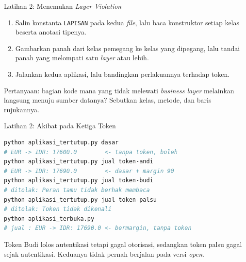 \documentclass[aspectratio=169, table, 12pt]{beamer}
\begin{document}
\begin{frame}[fragile]{{\Large Latihan 2: Menemukan \textit{Layer Violation}}}
  \vspace{3pt}
  \vspace{2pt}
  \begin{enumerate}
    \item Salin konstanta \texttt{LAPISAN} pada kedua \textit{file}, lalu baca
          konstruktor setiap kelas beserta anotasi tipenya.
    \item Gambarkan panah dari kelas pemegang ke kelas yang dipegang, lalu
          tandai panah yang melompati satu \textit{layer} atau lebih.
    \item Jalankan kedua aplikasi, lalu bandingkan perlakuannya terhadap token.
  \end{enumerate}

  \vspace{6pt}
  {\small Pertanyaan: bagian kode mana yang tidak melewati \textit{business
  layer} melainkan langsung menuju sumber datanya? Sebutkan kelas, metode, dan
  baris rujukannya.}
\end{frame}

\begin{frame}[fragile]{{\Large Latihan 2: Akibat pada Ketiga Token}}
  \vspace{5pt}
\begin{lstlisting}[language=bash]
python aplikasi_tertutup.py dasar
# EUR -> IDR: 17600.0        <- tanpa token, boleh
python aplikasi_tertutup.py jual token-andi
# EUR -> IDR: 17690.0        <- dasar + margin 90
python aplikasi_tertutup.py jual token-budi
# ditolak: Peran tamu tidak berhak membaca
python aplikasi_tertutup.py jual token-palsu
# ditolak: Token tidak dikenali
python aplikasi_terbuka.py
# jual : EUR -> IDR: 17690.0 <- bermargin, tanpa token
\end{lstlisting}

  \vspace{5pt}
  {\small Token Budi lolos autentikasi tetapi gagal otorisasi, sedangkan token
  palsu gagal sejak autentikasi. Keduanya tidak pernah berjalan pada versi
  \textit{open}.}
\end{frame}
\end{document}
